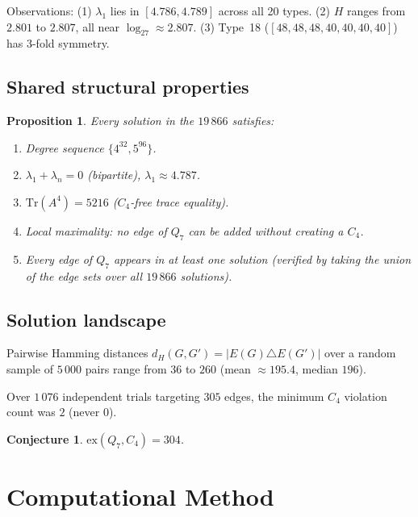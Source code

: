 \documentclass[12pt,a4paper]{article}
\newtheorem{proposition}[theorem]{Proposition}
\newtheorem{conjecture}[theorem]{Conjecture}
\theoremstyle{definition}
\newcommand{\ex}{\mathrm{ex}}
\begin{document}
Observations: (1) $\lambda_1$ lies in $[4.786,4.789]$ across all 20 types.
(2) $H$ ranges from $2.801$ to $2.807$, all near $\log_27\approx2.807$.
(3) Type~18 ($[48,48,48,40,40,40,40]$) has 3-fold symmetry.

\subsection{Shared structural properties}

\begin{proposition}\label{prop:rigid}
Every solution in the $19\,866$ satisfies:
\begin{enumerate}[label=(\roman*)]
  \item Degree sequence $\{4^{32},5^{96}\}$.
  \item $\lambda_1+\lambda_n=0$ (bipartite), $\lambda_1\approx4.787$.
  \item $\mathrm{Tr}(A^4)=5216$ ($C_4$-free trace equality).
  \item Local maximality: no edge of $Q_7$ can be added without creating a $C_4$.
  \item Every edge of $Q_7$ appears in at least one solution
    (verified by taking the union of the edge sets over all $19\,866$ solutions).
\end{enumerate}
\end{proposition}

\subsection{Solution landscape}\label{sec:landscape}

Pairwise Hamming distances $d_H(G,G')=|E(G)\triangle E(G')|$
over a random sample of $5\,000$ pairs range from $36$ to $260$
(mean $\approx195.4$, median $196$).

Over $1\,076$ independent trials targeting $305$ edges,
the minimum $C_4$ violation count was $2$ (never $0$).

\begin{conjecture}\label{conj:q7}
$\ex(Q_7,C_4)=304$.
\end{conjecture}

\section{Computational Method}\label{sec:method}
\end{document}
